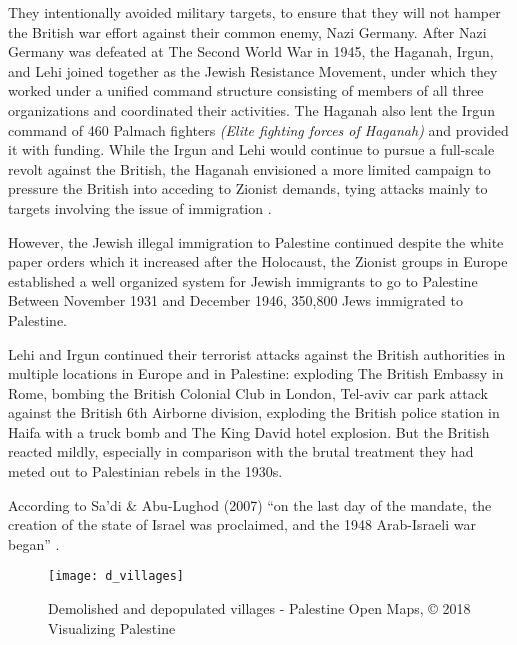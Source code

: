 They intentionally avoided military targets, to ensure that they will not hamper the British war effort against their common enemy, Nazi Germany. After Nazi Germany was defeated at The Second World War in 1945, the Haganah, Irgun, and Lehi joined together as the Jewish Resistance Movement, under which they worked under a unified command structure consisting of members of all three organizations and coordinated their activities. The Haganah also lent the Irgun command of 460 Palmach fighters \textit{(Elite fighting forces of Haganah)} and provided it with funding. While the Irgun and Lehi would continue to pursue a full-scale revolt against the British, the Haganah envisioned a more limited campaign to pressure the British into acceding to Zionist demands, tying attacks mainly to targets involving the issue of immigration \citep{Bell1976}\citep{Shlaim2014}.

However, the Jewish illegal immigration to Palestine continued despite the white paper orders which it increased after the Holocaust, the Zionist groups in Europe established a well organized system for Jewish immigrants to go to Palestine Between November 1931 and December 1946, 350,800 Jews immigrated to Palestine\citep{Grob-Fitzgibbon2011}\citep{Heller1995}.   

Lehi and Irgun continued their terrorist attacks against the British authorities in multiple locations in Europe and in Palestine: exploding The British Embassy in Rome, bombing the British Colonial Club in London, Tel-aviv car park attack against the British 6th Airborne division, exploding the British police station in Haifa with a truck bomb and The King David hotel explosion\citep{Bell1976}. But the British reacted mildly, especially in comparison with the brutal treatment they had meted out to Palestinian rebels in the 1930s\citep{Pappe2006}.
 
 
 
 According to Sa’di \& Abu-Lughod
(2007) “on the last day of the mandate, the creation of the state of Israel was proclaimed,
and the 1948 Arab-Israeli war began” \citep{Sadi2007}. 

\begin{wrapfigure}{r}{0.20\textwidth} %
    \centering
    \texttt{[image: d\_villages]}
    \caption{Demolished and depopulated villages - Palestine Open Maps, © 2018  Visualizing Palestine}
    \label{fig:map}
\end{wrapfigure}



